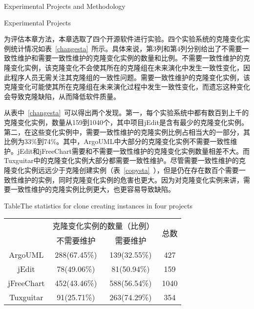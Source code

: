 
{Experimental Projects and Methodology}

{Experimental Projects}

为评估本章方法，本章选取了四个开源软件进行实验。四个实验系统的克隆变化实例统计情况如表~\ref{changesta}~所示。具体来说，第3列和第4列分别给出了不需要一致性维护和需要一致性维护的克隆变化实例的数量和比例。不需要一致性维护的克隆变化实例，该克隆变化不会使其所在的克隆组在未来演化中发生一致性变化，因此程序人员无需关注其克隆组的一致性问题。需要一致性维护的克隆变化实例，该克隆变化可能使其所在克隆组在未来演化过程中发生一致性变化，而遗忘这种变化会导致克隆缺陷，从而降低软件质量。

从表中~\ref{changesta}~可以得出两个发现。第一，每个实验系统中都有数百到上千的克隆变化实例，数量从159到1040个，其中项目{jEdit}是含有最少的克隆变化实例。第二，在这些变化实例中，需要一致性维护的克隆实例比例占相当大的一部分，其比例为33\%到74\%。其中，ArgoUML中大部分的克隆变化实例不需要一致性维护。jEdit和jFreeChart需要和不需要一致性维护的克隆变化实例数量相差不大。而Tuxguitar中的克隆变化实例大部分都需要一致性维护。尽管需要一致性维护的克隆变化实例远远少于克隆创建实例（表~\ref{copysta}~），但是仍在存在数百个需要一致性维护的实例，同时克隆变化实例的危害也更大。因为对克隆变化实例来讲，需要一致性维护的克隆实例比例更大，也更容易导致缺陷。

\begin{table}[htbp]
{Table$\!$}{The statistics for clone creating instances in four projects}
\vspace{0.5em}
\centering
\wuhao
\begin{tabular}{cccc}
\toprule[1.5pt]
~\multirow{2}{*}{实验系统}& \multicolumn{2}{c}{克隆变化实例的数量（比例）} & \multirow{2}{*}{总数}\\ 
 \cline{2-3}
~&{不需要维护} &{需要维护} & ~\\
\midrule[1pt]
ArgoUML&288(67.45\%)&139(32.55\%)&427\\
jEdit&78(49.06\%)&81(50.94\%)&159\\
jFreeChart&452(43.46\%)&588(56.54\%)&1040\\
Tuxguitar&91(25.71\%)&263(74.29\%)&354\\
\bottomrule[1.5pt]
\end{tabular}
\end{table}

